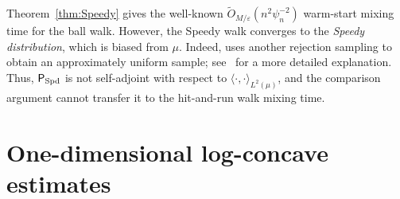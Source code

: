 \documentclass[11pt]{article}
\theoremstyle{definition}
\theoremstyle{remark}
\begin{document}
Theorem~\ref{thm:Speedy} gives the well-known $\widetilde{O}_{M/\varepsilon}(n^2\psi_n^{-2})$ warm-start mixing time for the ball walk. However, the Speedy walk converges to the \emph{Speedy distribution}, which is biased from $\mu$. Indeed, \cite{KLS97} uses another rejection sampling to obtain an approximately uniform sample; see~\cite[Appendix C]{KookVempalaZhangInOut} for a more detailed explanation. Thus, ${\sf P}_{\rm Spd}$ is not self-adjoint with respect to $\langle \cdot,\cdot\rangle_{L^2(\mu)}$, and the comparison argument cannot transfer it to the hit-and-run walk mixing time.


\section{One-dimensional log-concave estimates}
\label{app:one-dimensional-facts}
\onedimest*
\end{document}
